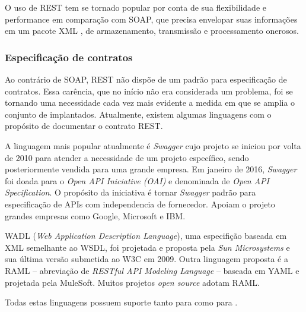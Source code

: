 O uso de REST tem se tornado popular por conta de sua flexibilidade e
performance em comparação com SOAP, que precisa envelopar suas informações em
um pacote XML \cite{mumbaikar2013web}, de armazenamento, transmissão e
processamento onerosos.

\subsubsection{Especificação de contratos}
\vspace{-6mm}

Ao contrário de SOAP, REST não dispõe de um padrão para especificação de
contratos. Essa carência, que no início não era considerada um problema, foi se
tornando uma necessidade cada vez mais evidente a medida em que se amplia o
conjunto de \wss{} implantados. Atualmente, existem algumas linguagens com o
propósito de documentar o contrato REST.

A linguagem mais popular atualmente é \textit{Swagger} cujo projeto se iniciou
por volta de 2010 para atender a necessidade de um projeto específico, sendo posteriormente
vendida para uma grande empresa. Em janeiro de 2016, \textit{Swagger} foi doada
para o \textit{Open API Iniciative (OAI)} e denominada de \textit{Open API
Specification}. O propósito da iniciativa é tornar \textit{Swagger} padrão para
especificação de APIs com independencia de fornecedor. Apoiam o projeto grandes
empresas como Google\textsuperscript{\textregistered},
Microsoft\textsuperscript{\textregistered} e
IBM\textsuperscript{\textregistered}.

WADL (\textit{Web Application Description Language}), uma especifição baseada em
XML semelhante ao WSDL, foi projetada e proposta pela \textit{Sun
Microsystems}\textsuperscript{\textregistered} e sua última versão submetida
ao W3C em 2009. Outra linguagem proposta é a RAML\cite{RAML} -- abreviação de
\textit{RESTful API Modeling Language} -- baseada em YAML e projetada pela
MuleSoft\textsuperscript{\textregistered}. Muitos projetos \textit{open source} adotam RAML.

Todas estas linguagens possuem suporte tanto para \CdFirst{} como para
\CtFirst{} \cite{wideberg2015restful}.




